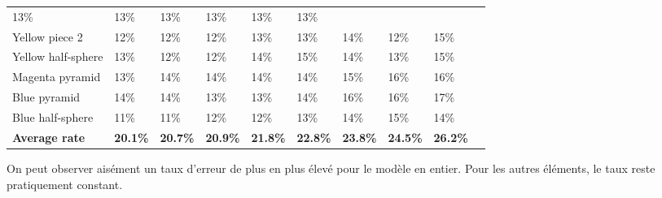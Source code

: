 \documentclass[a4paper, 12pt]{book}
\begin{document}
\begin{table}[H]
\begin{tabular}{c|lllllllll}
\multicolumn{1}{l|}{13\%}  & 
\multicolumn{1}{l|}{13\%}  & 
\multicolumn{1}{l|}{13\%}  & 
\multicolumn{1}{l|}{13\%}  & 
\multicolumn{1}{l|}{13\%}  & 
\multicolumn{1}{l|}{13\%}  & \\ 
\cline{1-9}
\multicolumn{1}{|l|}{Yellow piece 2}  & 
\multicolumn{1}{l|}{12\%}  & 
\multicolumn{1}{l|}{12\%}  & 
\multicolumn{1}{l|}{12\%}  &  
\multicolumn{1}{l|}{13\%}  & 
\multicolumn{1}{l|}{13\%}  & 
\multicolumn{1}{l|}{14\%}  & 
\multicolumn{1}{l|}{12\%}  & 
\multicolumn{1}{l|}{15\%}  & \\ 
\cline{1-9}
\multicolumn{1}{|l|}{Yellow half-sphere}  & 
\multicolumn{1}{l|}{13\%}  & 
\multicolumn{1}{l|}{12\%}  & 
\multicolumn{1}{l|}{12\%}  &  
\multicolumn{1}{l|}{14\%}  & 
\multicolumn{1}{l|}{15\%}  & 
\multicolumn{1}{l|}{14\%}  & 
\multicolumn{1}{l|}{13\%}  & 
\multicolumn{1}{l|}{15\%}  & 
\\ 
\cline{1-9}
\multicolumn{1}{|l|}{Magenta pyramid}  & 
\multicolumn{1}{l|}{13\%}  & 
\multicolumn{1}{l|}{14\%}  & 
\multicolumn{1}{l|}{14\%}  &  
\multicolumn{1}{l|}{14\%}  & 
\multicolumn{1}{l|}{14\%}  & 
\multicolumn{1}{l|}{15\%}  & 
\multicolumn{1}{l|}{16\%}  & 
\multicolumn{1}{l|}{16\%}  & \\ 
\cline{1-9}
\multicolumn{1}{|l|}{Blue pyramid}  & 
\multicolumn{1}{l|}{14\%}  & 
\multicolumn{1}{l|}{14\%}  & 
\multicolumn{1}{l|}{13\%}  &  
\multicolumn{1}{l|}{13\%}  & 
\multicolumn{1}{l|}{14\%}  & 
\multicolumn{1}{l|}{16\%}  & 
\multicolumn{1}{l|}{16\%}  & 
\multicolumn{1}{l|}{17\%}  & \\ 
\cline{1-9}
\multicolumn{1}{|l|}{Blue  half-sphere}  & 
\multicolumn{1}{l|}{11\%}  & 
\multicolumn{1}{l|}{11\%}  & 
\multicolumn{1}{l|}{12\%}  &  
\multicolumn{1}{l|}{12\%}  & 
\multicolumn{1}{l|}{13\%}  & 
\multicolumn{1}{l|}{14\%}  & 
\multicolumn{1}{l|}{15\%}  & 
\multicolumn{1}{l|}{14\%}  & \\ 
\cline{1-9}
\multicolumn{1}{|l|}{\textbf{Average rate}} & 
\multicolumn{1}{l|}{\textbf{20.1\%}}  & 
\multicolumn{1}{l|}{\textbf{20.7\%}}  &  
\multicolumn{1}{l|}{\textbf{20.9\%}}  & 
\multicolumn{1}{l|}{\textbf{21.8\%}}  & 
\multicolumn{1}{l|}{\textbf{22.8\%}}  & 
\multicolumn{1}{l|}{\textbf{23.8\%}}  & 
\multicolumn{1}{l|}{\textbf{24.5\%}}  &  
\multicolumn{1}{l|}{\textbf{26.2\%}}  &\\ 
\cline{1-9}

\end{tabular}
\end{table}

\vspace{2cm} 
\par On peut observer aisément un taux d'erreur de plus en plus élevé pour le modèle en entier. Pour les autres éléments, le taux reste pratiquement constant. 
\end{document}
